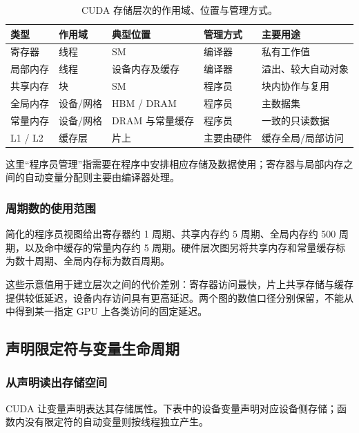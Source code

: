 \begin{table}[H]
\centering\small
\caption{CUDA 存储层次的作用域、位置与管理方式。}
\begin{tabularx}{\textwidth}{L{0.13\textwidth} L{0.11\textwidth} L{0.23\textwidth} L{0.15\textwidth} Y}
\toprule
类型 & 作用域 & 典型位置 & 管理方式 & 主要用途 \\
\midrule
寄存器 & 线程 & SM & 编译器 & 私有工作值 \\
局部内存 & 线程 & 设备内存及缓存 & 编译器 & 溢出、较大自动对象 \\
共享内存 & 块 & SM & 程序员 & 块内协作与复用 \\
全局内存 & 设备/网格 & HBM / DRAM & 程序员 & 主数据集 \\
常量内存 & 设备/网格 & DRAM 与常量缓存 & 程序员 & 一致的只读数据 \\
L1 / L2 & 缓存层 & 片上 & 主要由硬件 & 缓存全局/局部访问 \\
\bottomrule
\end{tabularx}
\end{table}
这里“程序员管理”指需要在程序中安排相应存储及数据使用；寄存器与局部内存之间的自动变量分配则主要由编译器处理。

\subsubsection{周期数的使用范围}
简化的程序员视图给出寄存器约 1 周期、共享内存约 5 周期、全局内存约 500 周期，以及命中缓存的常量内存约 5 周期。硬件层次图另将共享内存和常量缓存标为数十周期、全局内存标为数百周期。

这些示意值用于建立层次之间的代价差别：寄存器访问最快，片上共享存储与缓存提供较低延迟，设备内存访问具有更高延迟。两个图的数值口径分别保留，不能从中得到某一指定 GPU 上各类访问的固定延迟。

\subsection{声明限定符与变量生命周期}

\subsubsection{从声明读出存储空间}
CUDA 让变量声明表达其存储属性。下表中的设备变量声明对应设备侧存储；函数内没有限定符的自动变量则按线程独立产生。

